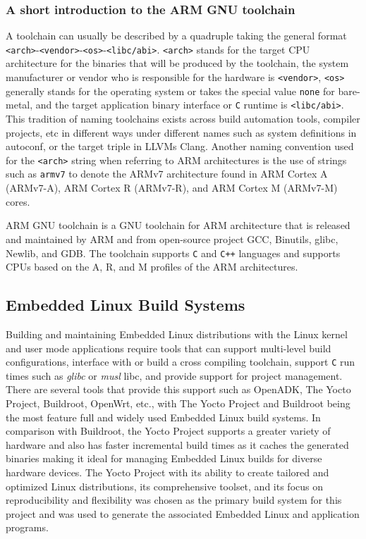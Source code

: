 \subsubsection{A short introduction to the ARM GNU toolchain}

A toolchain can usually be described by a quadruple taking the general format \texttt{<arch>}-\texttt{<vendor>}-\texttt{<os>}-\texttt{<libc/abi>}. \texttt{<arch>} stands for the target CPU architecture for the binaries that will be produced by the toolchain, the system manufacturer or vendor who is responsible for the hardware is \texttt{<vendor>}, \texttt{<os>} generally stands for the operating system or takes the special value \texttt{none} for bare-metal, and the target application binary interface or \texttt{C} runtime is \texttt{<libc/abi>}. This tradition of naming toolchains exists across build automation tools, compiler projects, etc in different ways under different names such as system definitions in autoconf, or the target triple in LLVM\textquotesingle s Clang. Another naming convention used for the \texttt{<arch>} string when referring to ARM architectures is the use of strings such as \texttt{armv7} to denote the ARMv7 architecture found in ARM Cortex A (ARMv7-A), ARM Cortex R (ARMv7-R), and ARM Cortex M (ARMv7-M) cores.

ARM GNU toolchain is a GNU toolchain for ARM architecture that is released and maintained by ARM and from open-source project GCC, Binutils, glibc, Newlib, and GDB. The toolchain supports \texttt{C} and \texttt{C++} languages and supports CPUs based on the A, R, and M profiles of the ARM architectures.

\subsection{Embedded Linux Build Systems}

Building and maintaining Embedded Linux distributions with the Linux kernel and user mode applications require tools that can support multi-level build configurations, interface with or build a cross compiling toolchain, support \texttt{C} run times such as \textit{glibc} or \textit{musl} libc, and provide support for project management. There are several tools that provide this support such as OpenADK, The Yocto Project, Buildroot, OpenWrt, etc., with The Yocto Project and Buildroot being the most feature full and widely used Embedded Linux build systems. In comparison with Buildroot, the Yocto Project supports a greater variety of hardware and also has faster incremental build times as it caches the generated binaries \cite{yocto} making it ideal for managing Embedded Linux builds for diverse hardware devices. The Yocto Project with its ability to create tailored and optimized Linux distributions, its comprehensive toolset, and its focus on reproducibility and flexibility was chosen as the primary build system for this project and was used to generate the associated Embedded Linux and application programs.

